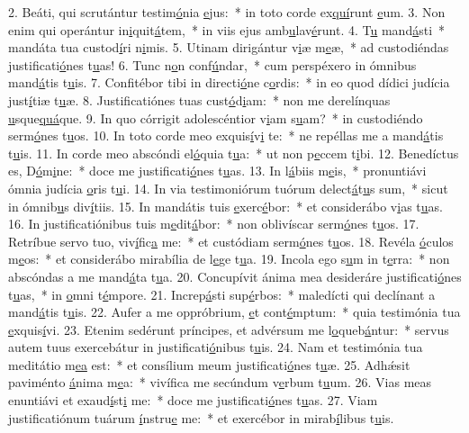 2. Beáti, qui scrutántur testim\uline{ó}nia \uline{e}jus:~* in toto corde ex\uline{quí}runt \uline{e}um.
3. Non enim qui operántur in\uline{i}quit\uline{á}tem,~* in viis ejus amb\uline{u}lav\uline{é}runt.
4. T\uline{u} mand\uline{á}sti~* mandáta tua custod\uline{í}ri n\uline{i}mis.
5. Utinam dirigántur v\uline{i}æ m\uline{e}æ,~* ad custodiéndas justificati\uline{ó}nes t\uline{u}as!
6. Tunc n\uline{o}n conf\uline{ú}ndar,~* cum perspéxero in ómnibus mand\uline{á}tis t\uline{u}is.
7. Confitébor tibi in directi\uline{ó}ne c\uline{o}rdis:~* in eo quod dídici judícia just\uline{í}tiæ t\uline{u}æ.
8. Justificatiónes tuas cust\uline{ó}d\uline{i}am:~* non me derelínquas \uline{u}sque\uline{quá}que.
9. In quo córrigit adolescéntior v\uline{i}am s\uline{u}am?~* in custodiéndo serm\uline{ó}nes t\uline{u}os.
10. In toto corde meo exquis\uline{í}v\uline{i} te:~* ne repéllas me a mand\uline{á}tis t\uline{u}is.
11. In corde meo abscóndi el\uline{ó}quia t\uline{u}a:~* ut non p\uline{e}ccem t\uline{i}bi.
12. Benedíctus es, D\uline{ó}m\uline{i}ne:~* doce me justificati\uline{ó}nes t\uline{u}as.
13. In l\uline{á}biis m\uline{e}is,~* pronuntiávi ómnia judícia \uline{o}ris t\uline{u}i.
14. In via testimoniórum tuórum delect\uline{á}t\uline{u}s sum,~* sicut in ómnib\uline{u}s div\uline{í}tiis.
15. In mandátis tuis \uline{e}xerc\uline{é}bor:~* et considerábo v\uline{i}as t\uline{u}as.
16. In justificatiónibus tuis m\uline{e}dit\uline{á}bor:~* non oblivíscar serm\uline{ó}nes t\uline{u}os.
17. Retríbue servo tuo, viv\uline{í}fic\uline{a} me:~* et custódiam serm\uline{ó}nes t\uline{u}os.
18. Revéla \uline{ó}culos m\uline{e}os:~* et considerábo mirabília de l\uline{e}ge t\uline{u}a.
19. Incola ego s\uline{u}m in t\uline{e}rra:~* non abscóndas a me mand\uline{á}ta t\uline{u}a.
20. Concupívit ánima mea desideráre justificati\uline{ó}nes t\uline{u}as,~* in \uline{o}mni t\uline{é}mpore.
21. Increp\uline{á}sti sup\uline{é}rbos:~* maledícti qui declínant a mand\uline{á}tis t\uline{u}is.
22. Aufer a me oppróbrium, \uline{e}t cont\uline{é}mptum:~* quia testimónia tua \uline{e}xquis\uline{í}vi.
23. Etenim sedérunt príncipes, et advérsum me l\uline{o}queb\uline{á}ntur:~* servus autem tuus exercebátur in justificati\uline{ó}nibus t\uline{u}is.
24. Nam et testimónia tua meditátio m\uline{e}\uline{a} est:~* et consílium meum justificati\uline{ó}nes t\uline{u}æ.
25. Adhǽsit paviménto \uline{á}nima m\uline{e}a:~* vivífica me secúndum v\uline{e}rbum t\uline{u}um.
26. Vias meas enuntiávi et exaud\uline{í}st\uline{i} me:~* doce me justificati\uline{ó}nes t\uline{u}as.
27. Viam justificatiónum tuárum \uline{í}nstru\uline{e} me:~* et exercébor in mirab\uline{í}libus t\uline{u}is.
